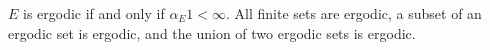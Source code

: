 $E$ is ergodic if and only if $\alpha_E 1 < \infty$. All finite sets are ergodic, a subset of an ergodic set is ergodic, and the union of two ergodic sets is ergodic.
